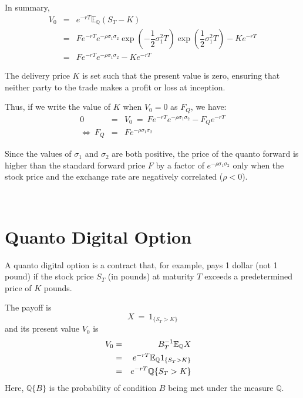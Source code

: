 \documentclass[uplatex,a4j,12pt,dvipdfmx]{jsarticle}
\begin{document}
In summary,
%
%
\begin{eqnarray}
	V_{0}
	&=&
	e^{-rT}
	\mathbb{E}_{\mathbb{Q}}(S_{T}-K)
	\\ &=&
	F
	e^{-rT}
	e^{- \rho \sigma_{1} \sigma_{2}}
	\exp \left( -\dfrac{1}{2} \sigma_{1}^{2} T \right)
	\exp \left(\dfrac{1}{2} \sigma_{1}^{2} T \right)
	-
	Ke^{-rT}
	\\ &=&
	F
	e^{-rT}
	e^{- \rho \sigma_{1} \sigma_{2}}
	-
	Ke^{-rT}
\end{eqnarray}
%
%

The delivery price $K$ is set such that the present value is zero, ensuring that neither party to the trade makes a profit or loss at inception.

Thus, if we write the value of $K$ when $V_{0}=0$ as $F_{Q}$, we have:
%
%
\begin{eqnarray}
	0 &=& V_{0}
	\ = \
	F
	e^{-rT}
	e^{- \rho \sigma_{1} \sigma_{2}}
	-
	F_{Q} e^{-rT}
	\\
	\Longleftrightarrow
	\
	F_{Q}
	&=&
	F
	e^{- \rho \sigma_{1} \sigma_{2}}
\end{eqnarray}
%
%

Since the values of $\sigma_{1}$ and $\sigma_{2}$ are both positive,
the price of the quanto forward is higher than the standard forward price $F$ by a factor of $e^{- \rho \sigma_{1} \sigma_{2}}$
only when the stock price and the exchange rate are negatively correlated ($\rho < 0$).


\ \\[-10mm]

\section{Quanto Digital Option}

A quanto digital option is a contract that, for example, pays 1 dollar (not 1 pound) if the stock price $S_{T}$ (in pounds) at maturity $T$ exceeds a predetermined price of $K$ pounds.

The payoff is
$$
	X
	\ = \
	1_{ \{ S_{T}>K \} }
$$
and its present value $V_{0}$ is
%
%
\begin{eqnarray}
	\hspace{-10mm}
	V_{0}
	& = &
	B^{-1}_{T}
	\mathbb{E}_{\mathbb{Q}}
	X
	\\ & = &
	e^{-rT}
	\mathbb{E}_{\mathbb{Q}}
	1_{ \{ S_{T}>K \} }
	\\ & = &
	e^{-rT}
	\mathbb{Q}
	\{ S_{T}>K \}
\end{eqnarray}
%
%
Here, $\mathbb{Q}\{B\}$ is the probability of condition $B$ being met under the measure $\mathbb{Q}$.
\end{document}
